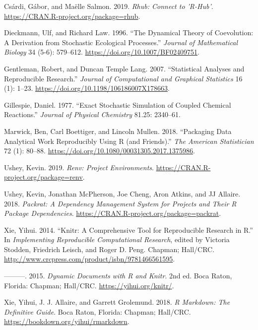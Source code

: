 \documentclass[
]{rescience}
\begin{document}
\leavevmode\hypertarget{ref-rhub}{}%
Csárdi, Gábor, and Maëlle Salmon. 2019. \emph{Rhub: Connect to 'R-Hub'}.
\url{https://CRAN.R-project.org/package=rhub}.

\leavevmode\hypertarget{ref-Dieckmann1996}{}%
Dieckmann, Ulf, and Richard Law. 1996. ``The Dynamical Theory of
Coevolution: A Derivation from Stochastic Ecological Processes.''
\emph{Journal of Mathematical Biology} 34 (5-6): 579--612.
\url{https://doi.org/10.1007/BF02409751}.

\leavevmode\hypertarget{ref-TempleLang2007}{}%
Gentleman, Robert, and Duncan Temple Lang. 2007. ``Statistical Analyses
and Reproducible Research.'' \emph{Journal of Computational and
Graphical Statistics} 16 (1): 1--23.
\url{https://doi.org/10.1198/106186007X178663}.

\leavevmode\hypertarget{ref-Gillespie}{}%
Gillespie, Daniel. 1977. ``Exact Stochastic Simulation of Coupled
Chemical Reactions.'' \emph{Journal of Physical Chemistry} 81.25:
2340--61.

\leavevmode\hypertarget{ref-Marwick}{}%
Marwick, Ben, Carl Boettiger, and Lincoln Mullen. 2018. ``Packaging Data
Analytical Work Reproducibly Using R (and Friends).'' \emph{The American
Statistician} 72 (1): 80--88.
\url{https://doi.org/10.1080/00031305.2017.1375986}.

\leavevmode\hypertarget{ref-renv}{}%
Ushey, Kevin. 2019. \emph{Renv: Project Environments}.
\url{https://CRAN.R-project.org/package=renv}.

\leavevmode\hypertarget{ref-packrat}{}%
Ushey, Kevin, Jonathan McPherson, Joe Cheng, Aron Atkins, and JJ
Allaire. 2018. \emph{Packrat: A Dependency Management System for
Projects and Their R Package Dependencies}.
\url{https://CRAN.R-project.org/package=packrat}.

\leavevmode\hypertarget{ref-knitr}{}%
Xie, Yihui. 2014. ``Knitr: A Comprehensive Tool for Reproducible
Research in R.'' In \emph{Implementing Reproducible Computational
Research}, edited by Victoria Stodden, Friedrich Leisch, and Roger D.
Peng. Chapman; Hall/CRC.
\url{http://www.crcpress.com/product/isbn/9781466561595}.

\leavevmode\hypertarget{ref-knitr_book}{}%
---------. 2015. \emph{Dynamic Documents with R and Knitr}. 2nd ed. Boca
Raton, Florida: Chapman; Hall/CRC. \url{https://yihui.org/knitr/}.

\leavevmode\hypertarget{ref-rmarkdown}{}%
Xie, Yihui, J. J. Allaire, and Garrett Grolemund. 2018. \emph{R
Markdown: The Definitive Guide}. Boca Raton, Florida: Chapman; Hall/CRC.
\url{https://bookdown.org/yihui/rmarkdown}.


\hypersetup{linkcolor=black,urlcolor=darkgray}
\renewcommand\emph[1]{{\bfseries #1}}
\setlength\bibitemsep{0pt}
\printbibliography
\end{document}
